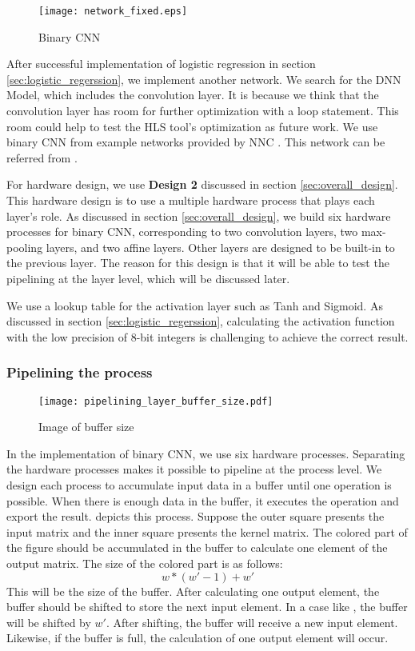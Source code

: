 \begin{figure*}[tbp]
  \center
  \texttt{[image: network\_fixed.eps]}
  \caption{Binary CNN}
  \label{fig:binary_cnn_network}
\end{figure*}

After successful implementation of logistic regression in section \ref{sec:logistic_regerssion}, we implement another network.
We search for the DNN Model, which includes the convolution layer. It is because we think that the convolution layer has room for further optimization with a loop statement. This room could help to test the HLS tool's optimization as future work. We use binary CNN from example networks provided by NNC \cite{webpage:nnc_project}. This network can be referred from .

For hardware design, we use \textbf{Design 2} discussed in section \ref{sec:overall_design}. This hardware design is to use a multiple hardware process that plays each layer's role. As discussed in section \ref{sec:overall_design}, we build six hardware processes for binary CNN, corresponding to two convolution layers, two max-pooling layers, and two affine layers. Other layers are designed to be built-in to the previous layer. The reason for this design is that it will be able to test the pipelining at the layer level, which will be discussed later.

We use a lookup table for the activation layer such as Tanh and Sigmoid. As discussed in section \ref{sec:logistic_regerssion}, calculating the activation function with the low precision of 8-bit integers is challenging to achieve the correct result.

\subsubsection{Pipelining the process} \label{sec:bin_pipe}

\begin{figure}[tbp]
  \centering
  \texttt{[image: pipelining\_layer\_buffer\_size.pdf]}
  \caption{Image of buffer size}%
  \label{fig:buffer_size}
\end{figure}

In the implementation of binary CNN, we use six hardware processes. Separating the hardware processes makes it possible to pipeline at the process level. We design each process to accumulate input data in a buffer until one operation is possible. When there is enough data in the buffer, it executes the operation and export the result.  depicts this process. Suppose the outer square presents the input matrix and the inner square presents the kernel matrix.
The colored part of the figure should be accumulated in the buffer to calculate one element of the output matrix. The size of the colored part is as follows:
\[w * (w' -1) + w'\]
This will be the size of the buffer. After calculating one output element, the buffer should be shifted to store the next input element. In a case like , the buffer will be shifted by $w'$. After shifting, the buffer will receive a new input element. Likewise, if the buffer is full, the calculation of one output element will occur.

